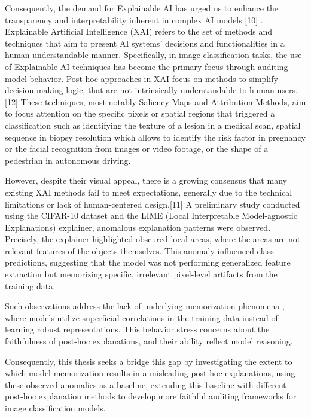 Consequently, the demand for Explainable AI has urged us to enhance the transparency and interpretability inherent in complex AI models [10] \cite{Yang2023SurveyOE}. Explainable Artificial Intelligence (XAI) refers to the set of methods and techniques that aim to present AI systems' decisions and functionalities in a human-understandable manner. Specifically, in image classification tasks, the use of Explainable AI techniques has become the primary focus through auditing model behavior. Post-hoc approaches  in XAI focus on methods to simplify decision making logic, that are not intrinsically understandable to human users.[12] \cite{Zschech2025Inherently} These techniques, most notably Saliency Maps and Attribution Methods, aim to focus attention on the specific pixels or spatial regions that triggered a classification such as identifying the texture of a lesion in a medical scan, spatial sequence in biopsy resolution which allows to identify the risk factor in pregnancy or the facial recognition from images or video footage, or the shape of a pedestrian in autonomous driving.

However, despite their visual appeal, there is a growing consensus that many existing XAI methods fail to meet expectations, generally due to the technical limitations or lack of human-centered design.[11] \cite{bove2025explanationsfailtypologydiscussion} A preliminary study conducted using the CIFAR-10 dataset and the LIME (Local Interpretable Model-agnostic Explanations) explainer, anomalous explanation patterns were observed. Precisely, the explainer highlighted obscured local areas, where the areas are not relevant features of the objects themselves. This anomaly influenced class predictions, suggesting that the model was not performing generalized feature extraction but memorizing specific, irrelevant pixel-level artifacts from the training data.

Such observations address the lack of underlying memorization phenomena , where models utilize superficial correlations in the training data instead of learning robust representations. This behavior stress concerns about the faithfulness of post-hoc explanations, and their ability reflect model reasoning.

Consequently, this thesis seeks a bridge this gap by investigating the extent to which model memorization results in a misleading post-hoc explanations, using these observed anomalies as a baseline, extending this baseline with different post-hoc explanation methods to develop more faithful auditing frameworks for image classification models.

